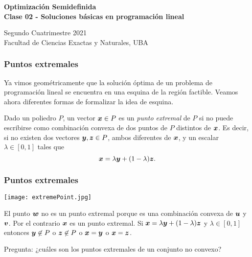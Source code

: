 \documentclass[aspectratio=169,12pt,spanish]{beamer}
\begin{document}

\begin{frame}

 \begin{center}

\Large\textbf{Optimización Semidefinida} \\
\large\textbf{Clase 02 - Soluciones básicas en programación lineal}




\vspace{1cm}
 Segundo Cuatrimestre 2021
 \\
 {\small Facultad de Ciencias Exactas y Naturales, UBA}
 \end{center}

\end{frame}


\begin{frame}
\frametitle{Puntos extremales}

Ya vimos geométricamente que la solución óptima de un problema de programación lineal se encuentra en una esquina de la región factible. Veamos ahora diferentes formas de formalizar la idea de esquina.

\begin{definition}
  Dado un poliedro $P$, un vector $\bm{x} \in P$ es un \emph{punto extremal} de $P$ si no puede escribirse como combinación convexa de dos puntos de $P$ distintos de $\bm{x}$. Es decir, si no existen dos vectores $\bm{y}, \bm{z} \in P$, ambos diferentes de $\bm{x}$, y un escalar $\lambda \in [0, 1]$ tales que
  $$\bm{x} = \lambda \bm{y} + (1-\lambda) \bm{z}.$$
\end{definition}


\end{frame}


\begin{frame}
\frametitle{Puntos extremales}

\begin{center}
\texttt{[image: extremePoint.jpg]}
\end{center}

El punto $\bm{w}$ no es un punto extremal porque es una combinación convexa de $\bm{u}$ y $\bm{v}$. Por el contrario $\bm{x}$ es un punto extremal. Si $\bm{x} = \lambda \bm{y} + (1-\lambda) \bm{z}$ y $\lambda \in [0,1]$ entonces $\bm{y} \not\in P$ o $\bm{z} \not\in P$ o $\bm{x} = \bm{y}$ o $\bm{x} = \bm{z}$.

Pregunta: ¿cuáles son los puntos extremales de un conjunto no convexo?
\end{frame}
\end{document}
